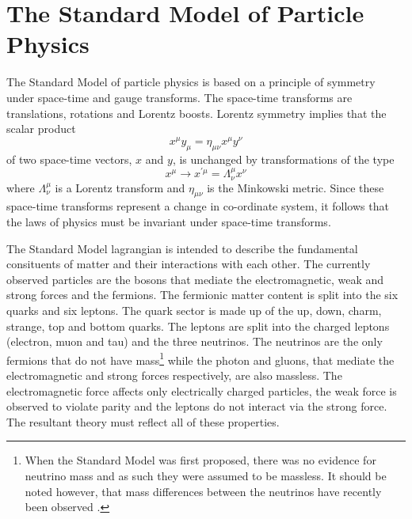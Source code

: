 \section{The Standard Model of Particle Physics}
 
The Standard Model of particle physics is based on a principle of symmetry under space-time and gauge transforms. The space-time transforms are translations, rotations and Lorentz boosts. 
Lorentz symmetry implies that  
the scalar product 
\begin{equation}
x^{\mu} y_{\mu} = \eta_{\mu \nu} x^{\mu}y^{\nu}
\end{equation}
of two space-time vectors, $x$ and $y$, is unchanged by transformations of the type
\begin{equation}
x^{\mu} \rightarrow x^{\prime \mu} = \Lambda^{\mu}_{\nu} x^{\nu}
\end{equation}
where $\Lambda^{\mu}_{\nu}$ is a Lorentz transform and $\eta_{\mu \nu}$ is the Minkowski metric. 
Since these space-time transforms represent a change in co-ordinate system, it follows that the laws of physics must be invariant under space-time transforms.


The Standard Model lagrangian is intended to describe the fundamental consituents of matter and their interactions with each other. The currently observed particles are the
bosons that mediate the electromagnetic, weak and strong forces and the fermions. 
The fermionic matter content is split into the six quarks and six leptons. The quark sector is made up of the up, down, charm, strange, top and bottom quarks. The leptons are split into the charged leptons  (electron, muon and tau) and the three neutrinos. The neutrinos are the only fermions that do not have mass\footnote{When the Standard Model was first proposed, there was no evidence for neutrino mass and as such they were assumed to be massless. It should be noted however, that mass differences between the neutrinos have recently been observed \cite{Tagg:2006sx}.}
 while the photon and gluons, that mediate the electromagnetic and strong forces respectively, are also massless.
The electromagnetic force affects only electrically charged particles, the weak force is observed to violate parity and the leptons do not interact via the strong force. The resultant theory must reflect all of these properties.

